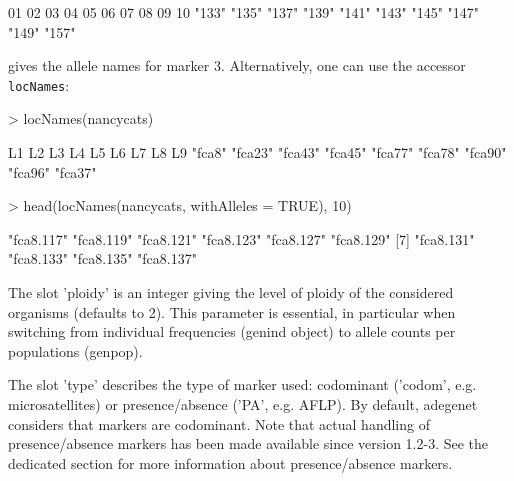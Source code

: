 \documentclass{article}
\begin{document}
\begin{Schunk}
\begin{Soutput}
   01    02    03    04    05    06    07    08    09    10 
"133" "135" "137" "139" "141" "143" "145" "147" "149" "157" 
\end{Soutput}
\end{Schunk}
gives the allele names for marker 3.
Alternatively, one can use the accessor \texttt{locNames}:
\begin{Schunk}
\begin{Sinput}
> locNames(nancycats)
\end{Sinput}
\begin{Soutput}
     L1      L2      L3      L4      L5      L6      L7      L8      L9 
 "fca8" "fca23" "fca43" "fca45" "fca77" "fca78" "fca90" "fca96" "fca37" 
\end{Soutput}
\begin{Sinput}
> head(locNames(nancycats, withAlleles = TRUE), 10)
\end{Sinput}
\begin{Soutput}
 [1] "fca8.117" "fca8.119" "fca8.121" "fca8.123" "fca8.127" "fca8.129"
 [7] "fca8.131" "fca8.133" "fca8.135" "fca8.137"
\end{Soutput}
\end{Schunk}


\noindent The slot 'ploidy' is an integer giving the level of ploidy
of the considered organisms (defaults to 2).
This parameter is essential, in particular when switching from
individual frequencies (genind object) to allele counts per
populations (genpop).

\noindent
The slot 'type' describes the type of marker used: codominant ('codom', e.g. microsatellites) or presence/absence ('PA', e.g. AFLP).
By default, adegenet considers that markers are codominant.
Note that actual handling of presence/absence markers has been made available since version 1.2-3.
See the dedicated section for more information about presence/absence markers.
\end{document}
